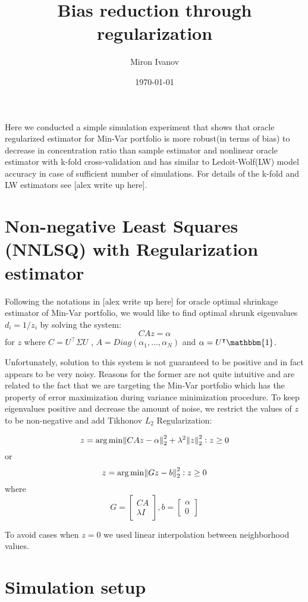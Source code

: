 \documentclass{article}
\title{Bias reduction through regularization}
\author{Miron Ivanov }
\date{\today}
\begin{document}
\maketitle

Here we conducted a simple simulation experiment that shows that oracle regularized estimator for Min-Var portfolio is more robust(in terms of bias) to decrease in concentration ratio than sample estimator and nonlinear oracle estimator with k-fold cross-validation and has similar to Ledoit-Wolf(LW) model accuracy in case of sufficient number of simulations. For details of the k-fold and LW estimators see [alex write up here].

\section*{Non-negative Least Squares (NNLSQ) with Regularization estimator}

Following the notations in [alex write up here] for oracle optimal shrinkage estimator of Min-Var portfolio, we would like to find optimal shrunk eigenvalues $d_i = 1/z_i$ by solving the system: 
$$
CAz=\alpha
$$
for $z$ where $ C = U^\intercal \Sigma U $ , $ A = Diag(\alpha_1,...,\alpha_N)$ and $\alpha=U^\intercal \mathbbm{1} $.

Unfortunately, solution to this system is not guaranteed to be positive and in fact appears to be very noisy. Reasons for the former are not quite intuitive and are related to the fact that we are targeting the Min-Var portfolio which has the property of error maximization during variance minimization procedure.
To keep eigenvalues positive and decrease the amount of noise, we restrict the values of $z$ to be non-negative and add Tikhonov $L_2$ Regularization: 

$$
z = \arg\min \norm{CAz-\alpha}^2_2 + \lambda^2 \norm{z}^2_2 : z\geq 0
$$
or
$$
z = \arg\min \norm{Gz-b}^2_2 : z\geq 0
$$
where
$$
G = \begin{bmatrix}
CA \\
\lambda I
\end{bmatrix} 
,b = \begin{bmatrix} 
\alpha \\
0
\end{bmatrix} 
$$

To avoid cases when $z=0$ we used linear interpolation between neighborhood values.

\section*{Simulation setup}
\end{document}
